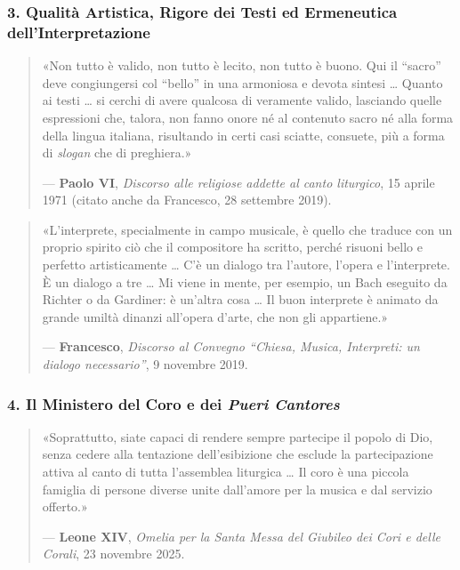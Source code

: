\documentclass[12pt,a4paper]{article}
\begin{document}
	\subsubsection{3. Qualità Artistica, Rigore dei Testi ed Ermeneutica dell'Interpretazione}\label{qualita-artistica-rigore-dei-testi-ed-ermeneutica-dellinterpretazione}
	
	\begin{quote}
		«Non tutto è valido, non tutto è lecito, non tutto è buono. Qui il ``sacro'' deve congiungersi col ``bello'' in una armoniosa e devota sintesi \ldots{} Quanto ai testi \ldots{} si cerchi di avere qualcosa di veramente valido, lasciando quelle espressioni che, talora, non fanno onore né al contenuto sacro né alla forma della lingua italiana, risultando in certi casi sciatte, consuete, più a forma di \emph{slogan} che di preghiera.»
		
		--- \textbf{Paolo VI}, \emph{Discorso alle religiose addette al canto liturgico}, 15 aprile 1971 (citato anche da Francesco, 28 settembre 2019).
	\end{quote}
	
	\begin{quote}
		«L'interprete, specialmente in campo musicale, è quello che traduce con un proprio spirito ciò che il compositore ha scritto, perché risuoni bello e perfetto artisticamente \ldots{} C'è un dialogo tra l'autore, l'opera e l'interprete. È un dialogo a tre \ldots{} Mi viene in mente, per esempio, un Bach eseguito da Richter o da Gardiner: è un'altra cosa \ldots{} Il buon interprete è animato da grande umiltà dinanzi all'opera d'arte, che non gli appartiene.»
		
		--- \textbf{Francesco}, \emph{Discorso al Convegno ``Chiesa, Musica, Interpreti: un dialogo necessario''}, 9 novembre 2019.
	\end{quote}
	
	\subsubsection{4. Il Ministero del Coro e dei \emph{Pueri Cantores}}\label{il-ministero-del-coro-e-dei-pueri-cantores}
	
	\begin{quote}
		«Soprattutto, siate capaci di rendere sempre partecipe il popolo di Dio, senza cedere alla tentazione dell'esibizione che esclude la partecipazione attiva al canto di tutta l'assemblea liturgica \ldots{} Il coro è una piccola famiglia di persone diverse unite dall'amore per la musica e dal servizio offerto.»
		
		--- \textbf{Leone XIV}, \emph{Omelia per la Santa Messa del Giubileo dei Cori e delle Corali}, 23 novembre 2025.
	\end{quote}
	
\end{document}

